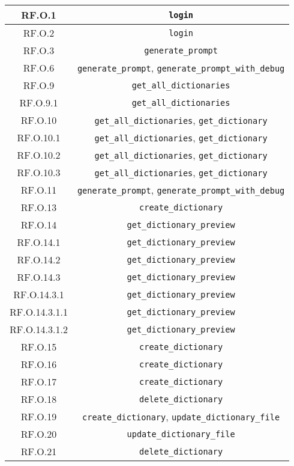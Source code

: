\begin{adjustwidth}{-0.5cm}{-0.5cm}
\begin{longtable}{|c|c|}
    RF.O.1 & \texttt{login} \\
	  \hline RF.O.2 & \texttt{login} \\
    \hline RF.O.3 & \texttt{generate\_prompt}\\
    \hline RF.O.6 & \texttt{generate\_prompt}, \texttt{generate\_prompt\_with\_debug} \\
    \hline RF.O.9 & \texttt{get\_all\_dictionaries} \\
    \hline RF.O.9.1 & \texttt{get\_all\_dictionaries} \\
    \hline RF.O.10 & \texttt{get\_all\_dictionaries}, \texttt{get\_dictionary} \\
    \hline RF.O.10.1 & \texttt{get\_all\_dictionaries}, \texttt{get\_dictionary} \\
    \hline RF.O.10.2 & \texttt{get\_all\_dictionaries}, \texttt{get\_dictionary} \\
    \hline RF.O.10.3 & \texttt{get\_all\_dictionaries}, \texttt{get\_dictionary} \\
    \hline RF.O.11 & \texttt{generate\_prompt}, \texttt{generate\_prompt\_with\_debug} \\
    \hline RF.O.13 & \texttt{create\_dictionary} \\
    \hline RF.O.14 & \texttt{get\_dictionary\_preview} \\
    \hline RF.O.14.1 & \texttt{get\_dictionary\_preview} \\
    \hline RF.O.14.2 & \texttt{get\_dictionary\_preview} \\
    \hline RF.O.14.3 & \texttt{get\_dictionary\_preview} \\
    \hline RF.O.14.3.1 & \texttt{get\_dictionary\_preview} \\
    \hline RF.O.14.3.1.1 & \texttt{get\_dictionary\_preview} \\
    \hline RF.O.14.3.1.2 & \texttt{get\_dictionary\_preview} \\
    \hline RF.O.15 & \texttt{create\_dictionary} \\
    \hline RF.O.16 & \texttt{create\_dictionary} \\
    \hline RF.O.17 & \texttt{create\_dictionary} \\
    \hline RF.O.18 & \texttt{delete\_dictionary} \\
    \hline RF.O.19 & \texttt{create\_dictionary}, \texttt{update\_dictionary\_file} \\
    \hline RF.O.20 & \texttt{update\_dictionary\_file} \\
    \hline RF.O.21 & \texttt{delete\_dictionary} \\

\end{longtable}
\end{adjustwidth}
